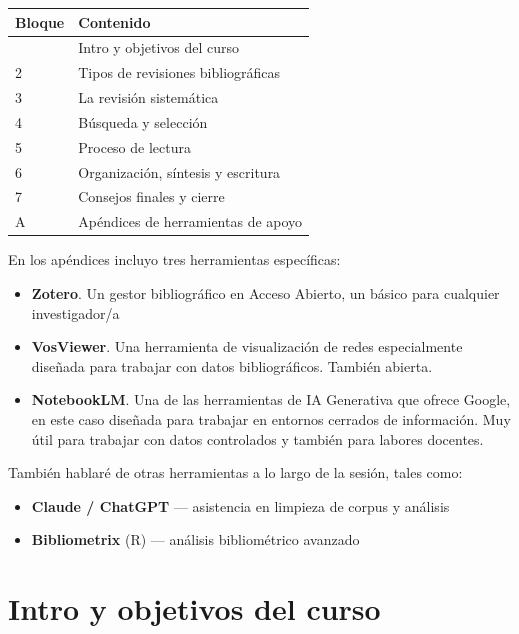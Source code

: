 \documentclass[
]{book}
\newcounter{none} %
\providecommand{\tightlist}{%
  \setlength{\itemsep}{0pt}\setlength{\parskip}{0pt}}
\begin{document}
{\def\LTcaptype{none} %
\begin{longtable}[]{@{}ll@{}}
\toprule\noalign{}
Bloque & Contenido \\
\midrule\noalign{}
\endhead
\bottomrule\noalign{}
\endlastfoot
1 & Intro y objetivos del curso \\
2 & Tipos de revisiones bibliográficas \\
3 & La revisión sistemática \\
4 & Búsqueda y selección \\
5 & Proceso de lectura \\
6 & Organización, síntesis y escritura \\
7 & Consejos finales y cierre \\
A & Apéndices de herramientas de apoyo \\
\end{longtable}
}

En los apéndices incluyo tres herramientas específicas:

\begin{itemize}
\tightlist
\item
  \textbf{Zotero}. Un gestor bibliográfico en Acceso Abierto, un básico para cualquier investigador/a
\item
  \textbf{VosViewer}. Una herramienta de visualización de redes especialmente diseñada para trabajar con datos bibliográficos. También abierta.
\item
  \textbf{NotebookLM}. Una de las herramientas de IA Generativa que ofrece Google, en este caso diseñada para trabajar en entornos cerrados de información. Muy útil para trabajar con datos controlados y también para labores docentes.
\end{itemize}

También hablaré de otras herramientas a lo largo de la sesión, tales como:

\begin{itemize}
\tightlist
\item
  \textbf{Claude / ChatGPT} --- asistencia en limpieza de corpus y análisis
\item
  \textbf{Bibliometrix} (R) --- análisis bibliométrico avanzado
\end{itemize}

\chapter{Intro y objetivos del curso}\label{intro-y-objetivos-del-curso}
\end{document}
